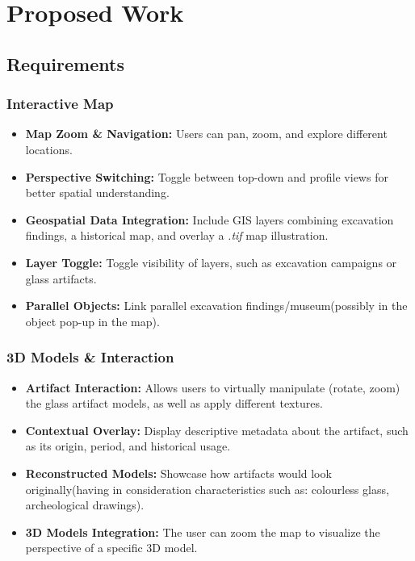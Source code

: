 
%

\chapter{Proposed Work}
\label{cha:proposed_work}

\section{Requirements}

\subsection*{Interactive Map}
\begin{itemize}
    \item \textbf{Map Zoom \& Navigation:} Users can pan, zoom, and explore different locations.
    \item \textbf{Perspective Switching:} Toggle between top-down and profile views for better spatial understanding.
    \item \textbf{Geospatial Data Integration:} Include \gls{GIS} layers combining excavation findings, a historical map, and overlay a \textit{.tif} map illustration.
    \item \textbf{Layer Toggle:} Toggle visibility of layers, such as excavation campaigns or glass artifacts.
    \item \textbf{Parallel Objects:} Link parallel excavation findings/museum(possibly in the object pop-up in the map).
\end{itemize}

\subsection*{\gls{3D} Models \& Interaction}
\begin{itemize}
    \item \textbf{Artifact Interaction:} Allows users to virtually manipulate (rotate, zoom) the glass artifact models, as well as apply different textures.
    \item \textbf{Contextual Overlay:} Display descriptive metadata about the artifact, such as its origin, period, and historical usage.
    \item \textbf{Reconstructed Models:} Showcase how artifacts would look originally(having in consideration characteristics such as: colourless glass, archeological drawings).
    \item \textbf{3D Models Integration:} The user can zoom the map to visualize the perspective of a specific \gls{3D} model.
\end{itemize}

